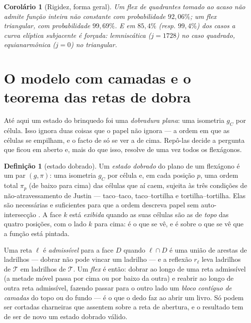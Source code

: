 \documentclass[11pt,a4paper]{article}
\theoremstyle{plain}
\newtheorem{corolario}[teorema]{Corolário}
\theoremstyle{definition}
\newtheorem{definicao}[teorema]{Definição}
\theoremstyle{remark}
\begin{document}
\begin{corolario}[Rigidez, forma geral]\label{cor:rigidez2}
Um flex de quadrantes tomado ao acaso não admite função inteira não constante
com probabilidade $92{,}06\%$; um flex triangular, com probabilidade
$99{,}69\%$. E em $85{,}4\%$ (resp. $99{,}4\%$) dos casos a curva elíptica
subjacente é \emph{forçada}: lemniscática ($j=1728$) no caso quadrado,
equianarmônica ($j=0$) no triangular.
\end{corolario}

\section{O modelo com camadas e o teorema das retas de dobra}\label{sec:camadas}

Até aqui um estado do brinquedo foi uma \emph{dobradura plana}: uma isometria
$g_C$ por célula. Isso ignora duas coisas que o papel não ignora --- a ordem
em que as células se empilham, e o facto de só se ver a de cima. Repô-las
decide a pergunta que ficou em aberto e, mais do que isso, resolve de uma vez
todos os flexágonos.

\begin{definicao}[estado dobrado]
Um \emph{estado dobrado} do plano de um flexágono é um par $(g,\pi)$: uma
isometria $g_C$ por célula e, em cada posição $p$, uma ordem total $\pi_p$ (de
baixo para cima) das células que aí caem, sujeita às três condições de
não-atravessamento de Justin --- taco--taco, taco--tortilha e
tortilha--tortilha. Elas são necessárias e suficientes para que a ordem
descreva papel sem auto-intersecção \cite{demaine}. A face $k$ está
\emph{exibida} quando as suas células são as de \emph{topo} das quatro
posições, com o lado $k$ para cima: é o que se vê, e é sobre o que se vê que a
função está pintada.
\end{definicao}

Uma reta $\ell$ é \emph{admissível} para a face $D$ quando $\ell\cap D$ é uma
união de arestas de ladrilhos --- dobrar não pode vincar um ladrilho --- e a
reflexão $r_\ell$ leva ladrilhos de $\mathcal T$ em ladrilhos de $\mathcal T$.
Um \emph{flex} é então: dobrar ao longo de uma reta admissível (a metade móvel
passa por cima ou por baixo da outra) e reabrir ao longo de outra reta
admissível, fazendo passar para o outro lado um \emph{bloco contíguo de
camadas} do topo ou do fundo --- é o que o dedo faz ao abrir um livro. Só
podem ser cortadas charneiras que assentem sobre a reta de abertura, e o
resultado tem de ser de novo um estado dobrado válido.
\end{document}
